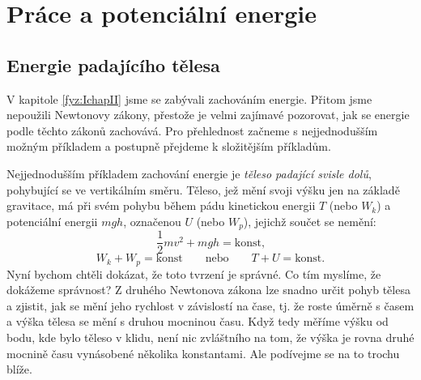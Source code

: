 {
\chapter{Práce a potenciální energie}\label{fyz:chap_fey_work}
\minitoc
  \section{Energie padajícího tělesa}
    V kapitole \ref{fyz:IchapII} jsme se zabývali zachováním energie. Přitom jsme nepoužili 
    Newtonovy zákony, přestože je velmi zajímavé pozorovat, jak se energie podle těchto zákonů 
    zachovává. Pro přehlednost začneme s nejjednodušším možným příkladem a postupně přejdeme k 
    složitějším příkladům.
    
    Nejjednodušším příkladem zachování energie je \emph{těleso padající svisle dolů}, pohybující se 
    ve vertikálním směru. Těleso, jež mění svoji výšku jen na základě gravitace, má při svém pohybu 
    během pádu kinetickou energii \(T\) (nebo \(W_k\)) a potenciální energii \(mgh\), označenou 
    \(U\) (nebo \(W_p\)), jejichž součet se nemění:
    \begin{equation}\label{FYZ:eq025}
      \frac{1}{2}mv^2 + mgh = \text{konst,}
    \end{equation}
    \begin{equation*}
      W_k + W_p = \text{konst} \qquad \text{nebo} \qquad T + U = \text{konst}.
    \end{equation*}
    Nyní bychom chtěli dokázat, že toto tvrzení je správné. Co tím myslíme, že dokážeme správnost? 
    Z druhého Newtonova zákona lze snadno určit pohyb tělesa a zjistit, jak se mění jeho rychlost v 
    závislostí na čase, tj. že roste úměrně s časem a výška tělesa se mění s druhou mocninou času. 
    Když tedy měříme výšku od bodu, kde bylo těleso v klidu, není nic zvláštního na tom, že výška 
    je rovna druhé mocnině času vynásobené několika konstantami. Ale podívejme se na to trochu 
    blíže.
    
}
